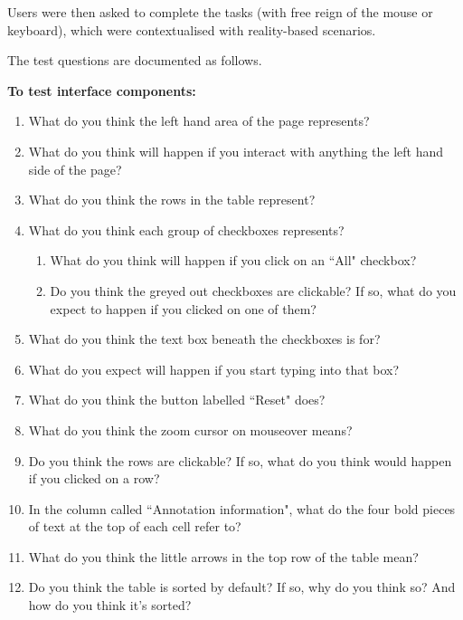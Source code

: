 Users were then asked to complete the tasks (with free reign of the mouse or keyboard), which were contextualised with reality-based scenarios.


The test questions are documented as follows.

\textbf{To test interface components:}
\begin{enumerate}
 \item What do you think the left hand area of the page represents?
 \item What do you think will happen if you interact with anything the left hand side of the page?
  \item What do you think the rows in the table represent?
  \item What do you think each group of checkboxes represents? 
   \begin{enumerate}
    \item What do you think will happen if you click on an ``All" checkbox?
    \item Do you think the greyed out checkboxes are clickable? If so, what do you expect to happen if you clicked on one of them?
   \end{enumerate}
  \item What do you think the text box beneath the checkboxes is for?
  \item What do you expect will happen if you start typing into that box?
  \item What do you think the button labelled ``Reset" does?
  \item What do you think the zoom cursor on mouseover means?
  \item Do you think the rows are clickable? If so, what do you think would happen if you clicked on a row?
  \item In the column called ``Annotation information", what do the four bold pieces of text at the top of each cell refer to?
  \item What do you think the little arrows in the top row of the table mean?
  \item Do you think the table is sorted by default? If so, why do you think so? And how do you think it's sorted? 
\end{enumerate}

